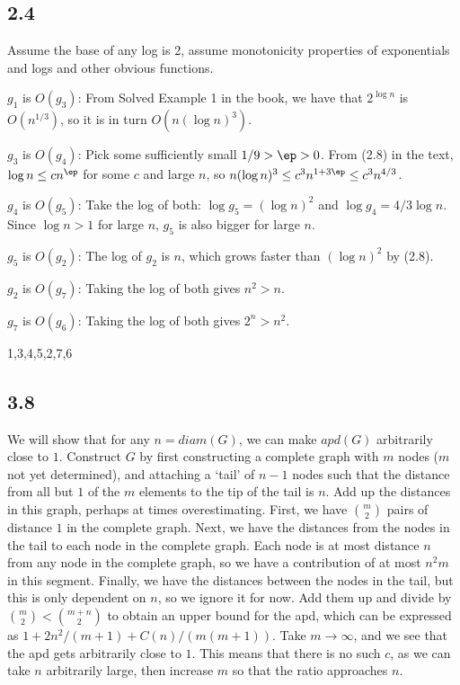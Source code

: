 \documentclass{article}
\begin{document}
\subsection*{2.4}
Assume the base of any log is 2, assume monotonicity properties of exponentials and logs and other obvious functions. 

$g_1$ is $O(g_3)$: From Solved Example 1 {in} the book, we have that $2^{\log n}$ is $O(n^{1/3})$, so it is in turn $O(n(\log n)^3)$.

$g_3$ is $O(g_4)$: Pick some sufficiently small $1/9>\ep>0$. From (2.8) in the text, $\log n\leq cn^\ep$ for some $c$ and large $n$, so $n(\log n)^3\leq c^3n^{1+3\ep}\leq c^3n^{4/3}$.

$g_4$ is $O(g_5)$: Take the log of both: $\log g_5=(\log n)^2$ and $\log g_4=4/3\log n$. Since $\log n>1$ for large $n$, $g_5$ is also bigger for large $n$.

$g_5$ is $O(g_2)$: The log of $g_2$ is $n$, which grows faster than $(\log n)^2$ by (2.8).

$g_2$ is $O(g_7)$: Taking the log of both gives $n^2>n$.

$g_7$ is $O(g_6)$: Taking the log of both gives $2^n>n^2$.

1,3,4,5,2,7,6
\subsection*{3.8}
We will show that for any $n=diam(G)$, we can make $apd(G)$ arbitrarily close to $1$. Construct $G$ by first constructing a complete graph with $m$ nodes ($m$ not yet determined), and attaching a `tail' of $n-1$ nodes such that the distance from all but $1$ of the $m$ elements to the tip of the tail is $n$. Add up the distances in this graph, perhaps at times overestimating. First, we have $\binom{m}{2}$ pairs of distance $1$ in the complete graph. Next, we have the distances from the nodes in the tail to each node in the complete graph. Each node is at most distance $n$ from any node in the complete graph, so we have a contribution of at most $n^2m$ in this segment. Finally, we have the distances between the nodes in the tail, but this is only dependent on $n$, so we ignore it for now. Add them up and divide by $\binom{m}{2}<\binom{m+n}{2}$ to obtain an upper bound for the apd, which can be expressed as $1+2n^2/(m+1)+C(n)/(m(m+1))$. Take $m\to\infty$, and we see that the apd gets arbitrarily close to $1$. This means that there is no such $c$, as we can take $n$ arbitrarily large, then increase $m$ so that the ratio approaches $n$.
\end{document}
